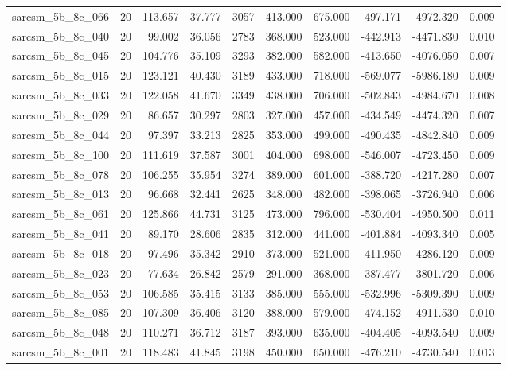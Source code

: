 \begin{tabular}{lrrrrrrrrr}
sarcsm\_5b\_8c\_066 & 20 & 113.657 & 37.777 & 3057 & 413.000 & 675.000 & -497.171 & -4972.320 & 0.009 \\
sarcsm\_5b\_8c\_040 & 20 & 99.002 & 36.056 & 2783 & 368.000 & 523.000 & -442.913 & -4471.830 & 0.010 \\
sarcsm\_5b\_8c\_045 & 20 & 104.776 & 35.109 & 3293 & 382.000 & 582.000 & -413.650 & -4076.050 & 0.007 \\
sarcsm\_5b\_8c\_015 & 20 & 123.121 & 40.430 & 3189 & 433.000 & 718.000 & -569.077 & -5986.180 & 0.009 \\
sarcsm\_5b\_8c\_033 & 20 & 122.058 & 41.670 & 3349 & 438.000 & 706.000 & -502.843 & -4984.670 & 0.008 \\
sarcsm\_5b\_8c\_029 & 20 & 86.657 & 30.297 & 2803 & 327.000 & 457.000 & -434.549 & -4474.320 & 0.007 \\
sarcsm\_5b\_8c\_044 & 20 & 97.397 & 33.213 & 2825 & 353.000 & 499.000 & -490.435 & -4842.840 & 0.009 \\
sarcsm\_5b\_8c\_100 & 20 & 111.619 & 37.587 & 3001 & 404.000 & 698.000 & -546.007 & -4723.450 & 0.009 \\
sarcsm\_5b\_8c\_078 & 20 & 106.255 & 35.954 & 3274 & 389.000 & 601.000 & -388.720 & -4217.280 & 0.007 \\
sarcsm\_5b\_8c\_013 & 20 & 96.668 & 32.441 & 2625 & 348.000 & 482.000 & -398.065 & -3726.940 & 0.006 \\
sarcsm\_5b\_8c\_061 & 20 & 125.866 & 44.731 & 3125 & 473.000 & 796.000 & -530.404 & -4950.500 & 0.011 \\
sarcsm\_5b\_8c\_041 & 20 & 89.170 & 28.606 & 2835 & 312.000 & 441.000 & -401.884 & -4093.340 & 0.005 \\
sarcsm\_5b\_8c\_018 & 20 & 97.496 & 35.342 & 2910 & 373.000 & 521.000 & -411.950 & -4286.120 & 0.009 \\
sarcsm\_5b\_8c\_023 & 20 & 77.634 & 26.842 & 2579 & 291.000 & 368.000 & -387.477 & -3801.720 & 0.006 \\
sarcsm\_5b\_8c\_053 & 20 & 106.585 & 35.415 & 3133 & 385.000 & 555.000 & -532.996 & -5309.390 & 0.009 \\
sarcsm\_5b\_8c\_085 & 20 & 107.309 & 36.406 & 3120 & 388.000 & 579.000 & -474.152 & -4911.530 & 0.010 \\
sarcsm\_5b\_8c\_048 & 20 & 110.271 & 36.712 & 3187 & 393.000 & 635.000 & -404.405 & -4093.540 & 0.009 \\
sarcsm\_5b\_8c\_001 & 20 & 118.483 & 41.845 & 3198 & 450.000 & 650.000 & -476.210 & -4730.540 & 0.013 \\

\end{tabular}

